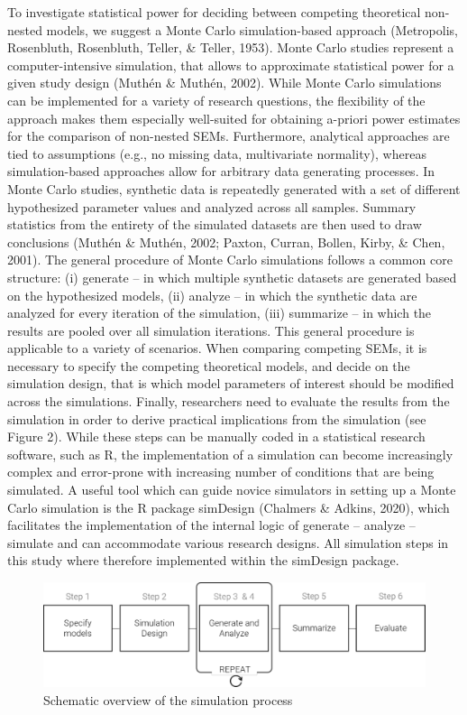 \documentclass[
  man,floatsintext]{apa6}
\begin{document}
To investigate statistical power for deciding between competing theoretical non-nested models, we suggest a Monte Carlo simulation-based approach (Metropolis, Rosenbluth, Rosenbluth, Teller, \& Teller, 1953). Monte Carlo studies represent a computer-intensive simulation, that allows to approximate statistical power for a given study design (Muthén \& Muthén, 2002). While Monte Carlo simulations can be implemented for a variety of research questions, the flexibility of the approach makes them especially well-suited for obtaining a-priori power estimates for the comparison of non-nested SEMs. Furthermore, analytical approaches are tied to assumptions (e.g., no missing data, multivariate normality), whereas simulation-based approaches allow for arbitrary data generating processes. In Monte Carlo studies, synthetic data is repeatedly generated with a set of different hypothesized parameter values and analyzed across all samples. Summary statistics from the entirety of the simulated datasets are then used to draw conclusions (Muthén \& Muthén, 2002; Paxton, Curran, Bollen, Kirby, \& Chen, 2001). The general procedure of Monte Carlo simulations follows a common core structure: (i) generate -- in which multiple synthetic datasets are generated based on the hypothesized models, (ii) analyze -- in which the synthetic data are analyzed for every iteration of the simulation, (iii) summarize -- in which the results are pooled over all simulation iterations. This general procedure is applicable to a variety of scenarios. When comparing competing SEMs, it is necessary to specify the competing theoretical models, and decide on the simulation design, that is which model parameters of interest should be modified across the simulations. Finally, researchers need to evaluate the results from the simulation in order to derive practical implications from the simulation (see Figure 2). While these steps can be manually coded in a statistical research software, such as R, the implementation of a simulation can become increasingly complex and error-prone with increasing number of conditions that are being simulated. A useful tool which can guide novice simulators in setting up a Monte Carlo simulation is the R package simDesign (Chalmers \& Adkins, 2020), which facilitates the implementation of the internal logic of generate -- analyze -- simulate and can accommodate various research designs. All simulation steps in this study where therefore implemented within the simDesign package.

\begin{figure}

{\centering \includegraphics[width=1\linewidth]{Images/Figure2} 

}

\caption{Schematic overview of the simulation process}\label{fig:Figure2}
\end{figure}
\end{document}

